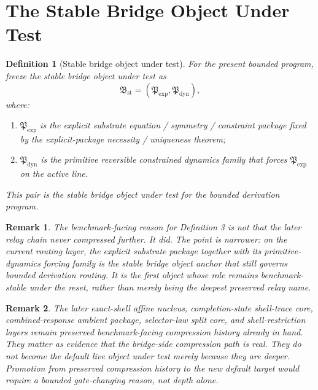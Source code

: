 \documentclass[11pt]{article}
\newcommand{\ExplicitPackage}{\mathfrak P_{\mathrm{exp}}}
\newcommand{\PrimitiveFamily}{\mathfrak P_{\mathrm{dyn}}}
\newcommand{\StableBridgeObject}{\mathfrak B_{\mathrm{st}}}
\newtheorem{definition}{Definition}
\newtheorem{remark}{Remark}
\begin{document}
\section{The Stable Bridge Object Under Test}

\begin{definition}[Stable bridge object under test]
For the present bounded program, freeze the stable bridge object under test as
\[
\StableBridgeObject=(\ExplicitPackage,\PrimitiveFamily),
\]
where:
\begin{enumerate}
    \item \(\ExplicitPackage\) is the explicit substrate equation / symmetry / constraint package fixed by the explicit-package necessity / uniqueness theorem;
    \item \(\PrimitiveFamily\) is the primitive reversible constrained dynamics family that forces \(\ExplicitPackage\) on the active line.
\end{enumerate}
This pair is the stable bridge object under test for the bounded derivation program.
\end{definition}

\begin{remark}
The benchmark-facing reason for Definition 3 is not that the later relay chain never compressed further. It did. The point is narrower: on the current routing layer, the explicit substrate package together with its primitive-dynamics forcing family is the stable bridge object anchor that still governs bounded derivation routing. It is the first object whose role remains benchmark-stable under the reset, rather than merely being the deepest preserved relay name.
\end{remark}

\begin{remark}
The later exact-shell affine nucleus, completion-state shell-trace core, combined-response ambient package, selector-law split core, and shell-restriction layers remain preserved benchmark-facing compression history already in hand. They matter as evidence that the bridge-side compression path is real. They do \emph{not} become the default live object under test merely because they are deeper. Promotion from preserved compression history to the new default target would require a bounded gate-changing reason, not depth alone.
\end{remark}
\end{document}

